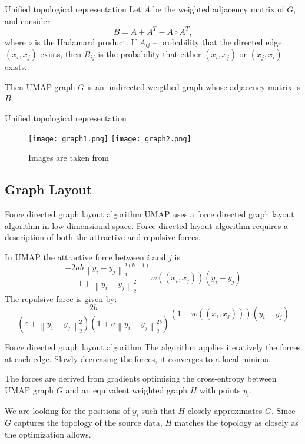 \documentclass{beamer}
\newcommand{\norm}[1]{\left\lVert#1\right\rVert}
\theoremstyle{named}
\begin{document}
\begin{frame}[fragile]{Unified topological representation}
	Let $A$ be the weighted adjacency matrix of $\bar{G}$, and consider
	\[
		B = A + A^T - A \circ A^T,
	\]
	where $\circ$ is the Hadamard product. If $A_{ij}$ -- probability that the directed edge $(x_i, x_j)$ exists, then $B_{ij}$ is the probability that either $(x_i, x_j)$ or $(x_j, x_i)$ exists.
	
	Then UMAP graph $G$ is an undirected weigthed graph whose adjacency matrix is $B$.
\end{frame}

\begin{frame}{Unified topological representation}
		\begin{figure}[htp]
		\centering
		\texttt{[image: graph1.png]}\hfill
		\texttt{[image: graph2.png]}
		\caption{Images are taken from \cite{docs}}
	\end{figure}
\end{frame}

\subsection{Graph Layout}

\begin{frame}{Force directed graph layout algorithm}
	UMAP uses a force directed graph layout algorithm in low dimensional space. Force directed layout algorithm requires a description of both the attractive and repulsive forces.
	
	In UMAP the attractive force between $i$ and $j$ is 
	\[
	\frac{-2ab\norm{y_i - y_j}_2^{2(b-1)}}{1 + \norm{y_i - y_j}_2^2}w((x_i, x_j))(y_i - y_j)
	\]
	The repulsive force is given by:
	\[
		\frac{2b}{(\varepsilon + \norm{y_i - y_j}_2^2)(1 + a\norm{y_i - y_j}_2^{2b})}(1 - w((x_i, x_j)))(y_i - y_j)
	\]
\end{frame}

\begin{frame}{Force directed graph layout algorithm}
	The algorithm applies iteratively the forces at each edge. Slowly decreasing the forces, it converges to a local minima.
	
	The forces are derived from gradients optimising the cross-entropy between UMAP graph $G$ and an equivalent weighted graph $H$ with points $y_i$. 
	
	We are looking for the positions of $y_i$ such that $H$ closely approximates $G$. Since $G$ captures the topology of the source data, $H$ matches the topology as closely as the optimization allows.
\end{frame}
\end{document}
